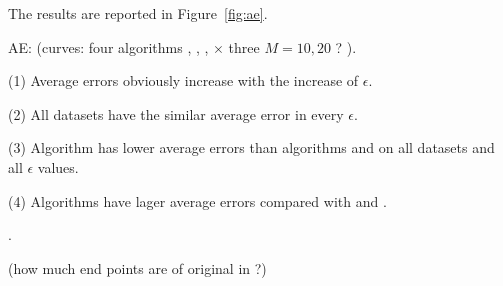The results are reported in Figure~\ref{fig:ae}.

AE: (\textcolor[rgb]{0.00,0.07,1.00}{curves: four algorithms \cist, \cista, \dpa, \squishe  $\times$  three $M = 10, {20}$ ? }).

\ni(1) Average errors obviously increase with the increase of $\epsilon$.

\ni(2) All datasets have the similar average \sed error in every $\epsilon$.

\ni(3) Algorithm \squishe has lower average errors than algorithms \dpa and \cist on all datasets and all $\epsilon$ values.

\ni(4) Algorithms \cist have lager average errors compared with \dpa and \squishe.



.

\textcolor[rgb]{1.00,0.00,0.00}{(how much end points are of original in \cista?)}





